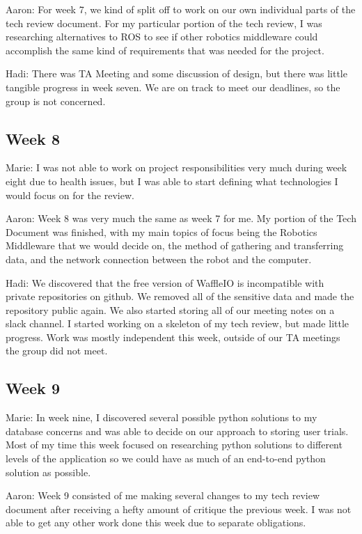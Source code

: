 \documentclass[onecolumn, draftclsnofoot,10pt, compsoc]{IEEEtran}
\begin{document}
Aaron: For week 7, we kind of split off to work on our own individual parts of the tech review document. For my particular portion of the tech review, I was researching alternatives to ROS to see if other robotics middleware could accomplish the same kind of requirements that was needed for the project.\par

Hadi: There was TA Meeting and some discussion of design, but there was little tangible progress in week seven. We are on track to meet our deadlines, so the group is not concerned. \par

\subsection{Week 8}
Marie: I was not able to work on project responsibilities very much during week eight due to health issues, but I was able to start defining what technologies I would focus on for the review.\par

Aaron: Week 8 was very much the same as week 7 for me. My portion of the Tech Document was finished, with my main topics of focus being the Robotics Middleware that we would decide on, the method of gathering and transferring data, and the network connection between the robot and the computer.\par

Hadi: We discovered that the free version of WaffleIO is incompatible with private repositories on github. We removed all of the sensitive data and made the repository public again. We also started storing all of our meeting notes on a slack channel. I started working on a skeleton of my tech review, but made little progress. Work was mostly independent this week, outside of our TA meetings the group did not meet.\par

\subsection{Week 9}
Marie: In week nine, I discovered several possible python solutions to my database concerns and was able to decide on our approach to storing user trials. Most of my time this week focused on researching python solutions to different levels of the application so we could have as much of an end-to-end python solution as possible.\par

Aaron: Week 9 consisted of me making several changes to my tech review document after receiving a hefty amount of critique the previous week. I was not able to get any other work done this week due to separate obligations.\par
\end{document}
